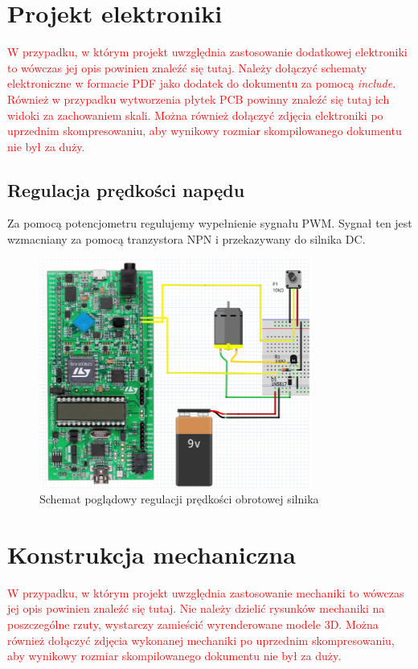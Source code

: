 \documentclass[10pt, a4paper]{article}
\begin{document}
\section{Projekt elektroniki}
\textcolor{red}{W przypadku, w którym projekt uwzględnia zastosowanie 
	dodatkowej elektroniki to wówczas jej opis powinien znaleźć się tutaj.
	Należy dołączyć schematy elektroniczne w formacie PDF 
	jako dodatek do dokumentu 
	za pomocą \textit{include}. Również w przypadku wytworzenia 
	płytek PCB powinny znaleźć się tutaj ich widoki za zachowaniem skali.
	Można również dołączyć zdjęcia 
	elektroniki po uprzednim skompresowaniu, aby wynikowy rozmiar 
	skompilowanego dokumentu nie był za duży.}
\subsection{Regulacja prędkości napędu}
Za pomocą potencjometru regulujemy wypełnienie sygnału PWM. Sygnał ten jest wzmacniany za pomocą tranzystora NPN i przekazywany do silnika DC.

\begin{figure}[H]
	\centering
	\includegraphics[width=0.8\textwidth]{figures/PWM.png}
	\caption{Schemat poglądowy regulacji prędkości obrotowej silnika}
	\label{fig:KonfiguracjaPWM}
\end{figure}

\section{Konstrukcja mechaniczna}
\textcolor{red}{W przypadku, w którym projekt uwzględnia zastosowanie 
	mechaniki to wówczas jej opis powinien znaleźć się tutaj.
	Nie należy dzielić rysunków mechaniki na poszczególne rzuty, 
	wystarczy zamieścić wyrenderowane modele 3D.
	Można również dołączyć zdjęcia wykonanej 
	mechaniki po uprzednim skompresowaniu, aby wynikowy rozmiar 
	skompilowanego dokumentu nie był za duży.}
\end{document}
